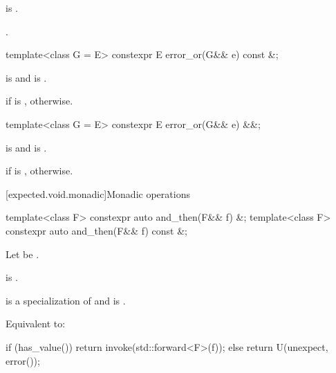 \begin{itemdescr}
\pnum
\expects
{} is .

\pnum
\returns
{}.
\end{itemdescr}

%
\begin{itemdecl}
template<class G = E> constexpr E error_or(G&& e) const &;
\end{itemdecl}

\begin{itemdescr}
\pnum
\mandates
{} is  and
 is .

\pnum
\returns
{} if  is ,
 otherwise.
\end{itemdescr}

%
\begin{itemdecl}
template<class G = E> constexpr E error_or(G&& e) &&;
\end{itemdecl}

\begin{itemdescr}
\pnum
\mandates
{} is  and
 is .

\pnum
\returns
{} if  is ,
 otherwise.
\end{itemdescr}

[expected.void.monadic]{Monadic operations}

%
\begin{itemdecl}
template<class F> constexpr auto and_then(F&& f) &;
template<class F> constexpr auto and_then(F&& f) const &;
\end{itemdecl}

\begin{itemdescr}
\pnum
Let  be .

\pnum
\constraints
{} is .

\pnum
\mandates
{} is a specialization of  and
 is .

\pnum
\effects
Equivalent to:
\begin{codeblock}
if (has_value())
  return invoke(std::forward<F>(f));
else
  return U(unexpect, error());
\end{codeblock}
\end{itemdescr}

